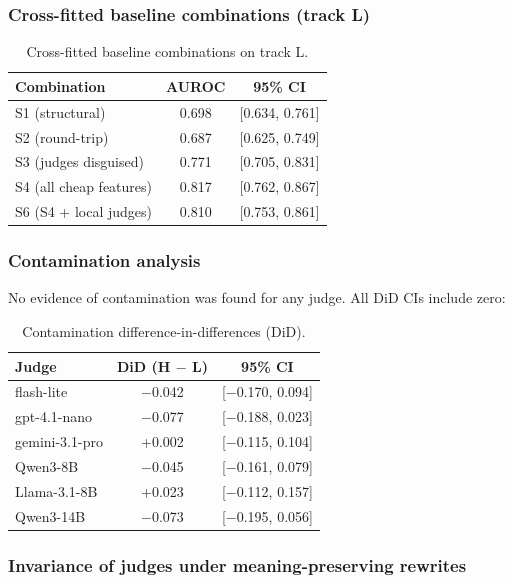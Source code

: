 \documentclass[11pt,letterpaper]{article}
\begin{document}
\subsubsection{Cross-fitted baseline combinations (track L)}

\begin{table}[!htbp]
\centering
\caption{Cross-fitted baseline combinations on track L.}
\label{tab:crossfitted_combos}
\begin{tabular}{lcc}
\toprule
Combination & AUROC & 95\% CI \\
\midrule
S1 (structural) & 0.698 & [0.634, 0.761] \\
S2 (round-trip) & 0.687 & [0.625, 0.749] \\
S3 (judges disguised) & 0.771 & [0.705, 0.831] \\
S4 (all cheap features) & 0.817 & [0.762, 0.867] \\
S6 (S4 + local judges) & 0.810 & [0.753, 0.861] \\
\bottomrule
\end{tabular}
\end{table}

\subsubsection{Contamination analysis}

No evidence of contamination was found for any judge. All DiD CIs include zero:

\begin{table}[!htbp]
\centering
\caption{Contamination difference-in-differences (DiD).}
\label{tab:contamination_did}
\begin{tabular}{lcc}
\toprule
Judge & DiD (H $-$ L) & 95\% CI \\
\midrule
flash-lite & $-$0.042 & [$-$0.170, 0.094] \\
gpt-4.1-nano & $-$0.077 & [$-$0.188, 0.023] \\
gemini-3.1-pro & +0.002 & [$-$0.115, 0.104] \\
Qwen3-8B & $-$0.045 & [$-$0.161, 0.079] \\
Llama-3.1-8B & +0.023 & [$-$0.112, 0.157] \\
Qwen3-14B & $-$0.073 & [$-$0.195, 0.056] \\
\bottomrule
\end{tabular}
\end{table}

\subsubsection{Invariance of judges under meaning-preserving rewrites}
\end{document}
